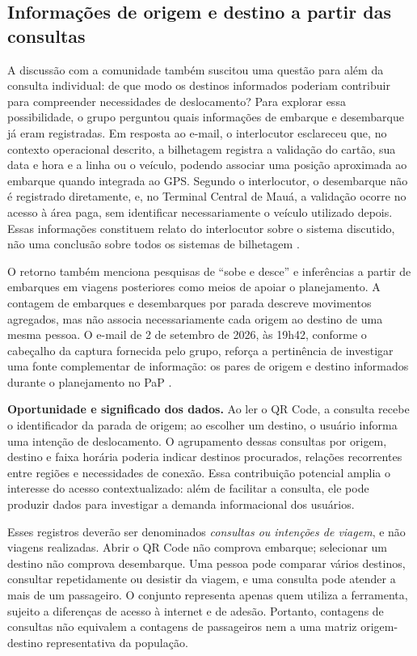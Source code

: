 \documentclass[12pt,oneside,a4paper,brazil]{abntex2}
\begin{document}
\subsection{Informações de origem e destino a partir das consultas}
A discussão com a comunidade também suscitou uma questão para além da consulta individual: de que modo os destinos informados poderiam contribuir para compreender necessidades de deslocamento? Para explorar essa possibilidade, o grupo perguntou quais informações de embarque e desembarque já eram registradas. Em resposta ao e-mail, o interlocutor esclareceu que, no contexto operacional descrito, a bilhetagem registra a validação do cartão, sua data e hora e a linha ou o veículo, podendo associar uma posição aproximada ao embarque quando integrada ao GPS. Segundo o interlocutor, o desembarque não é registrado diretamente, e, no Terminal Central de Mauá, a validação ocorre no acesso à área paga, sem identificar necessariamente o veículo utilizado depois. Essas informações constituem relato do interlocutor sobre o sistema discutido, não uma conclusão sobre todos os sistemas de bilhetagem \citep{osmaremailod}.

O retorno também menciona pesquisas de ``sobe e desce'' e inferências a partir de embarques em viagens posteriores como meios de apoiar o planejamento. A contagem de embarques e desembarques por parada descreve movimentos agregados, mas não associa necessariamente cada origem ao destino de uma mesma pessoa. O e-mail de 2 de setembro de 2026, às 19h42, conforme o cabeçalho da captura fornecida pelo grupo, reforça a pertinência de investigar uma fonte complementar de informação: os pares de origem e destino informados durante o planejamento no PaP \citep{osmaremailod}.

\textbf{Oportunidade e significado dos dados.} Ao ler o QR Code, a consulta recebe o identificador da parada de origem; ao escolher um destino, o usuário informa uma intenção de deslocamento. O agrupamento dessas consultas por origem, destino e faixa horária poderia indicar destinos procurados, relações recorrentes entre regiões e necessidades de conexão. Essa contribuição potencial amplia o interesse do acesso contextualizado: além de facilitar a consulta, ele pode produzir dados para investigar a demanda informacional dos usuários.

Esses registros deverão ser denominados \textit{consultas ou intenções de viagem}, e não viagens realizadas. Abrir o QR Code não comprova embarque; selecionar um destino não comprova desembarque. Uma pessoa pode comparar vários destinos, consultar repetidamente ou desistir da viagem, e uma consulta pode atender a mais de um passageiro. O conjunto representa apenas quem utiliza a ferramenta, sujeito a diferenças de acesso à internet e de adesão. Portanto, contagens de consultas não equivalem a contagens de passageiros nem a uma matriz origem-destino representativa da população.
\end{document}
